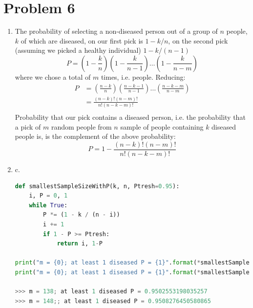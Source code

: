 \documentclass{article}
\newcommand{\1}{\mathbf{1}}
\begin{document}
\section*{Problem 6}
\begin{enumerate}
	\item The probability of selecting a non-diseased person out of a group of $n$ people, $k$ of which are diseased, on our first pick is $1 - k/n$, on the second pick (assuming we picked a healthy individual) $1-k/(n-1)$
	$$P = \left(1 - \frac{k}{n}\right) \left(1 - \frac{k}{n-1}\right) \dots \left(1 - \frac{k}{n-m}\right) $$
	where we chose a total of $m$ times, i.e. people. Reducing:
	\begin{align*}
    P &= \left(\frac{n-k}{n}\right) \left(\frac{n-k-1}{n-1}\right) \dots \left(\frac{n-k-m}{n-m}\right) \\
      &= \frac{(n-k)!(n-m)!}{n!(n-k-m)!} \\
    \end{align*}
    Probability that our pick contains a diseased person, i.e. the probability that a pick of $m$ random people from $n$ sample of people containing $k$ diseased people is, is the complement of the above probability:
    $$P = 1- \frac{(n-k)!(n-m)!}{n!(n-k-m)!}$$
    \item \addtocounter{enumi}{1} c.
        \begin{lstlisting}[language=Python]
def smallestSampleSizeWithP(k, n, Ptresh=0.95):
    i, P = 0, 1
    while True:
        P *= (1 - k / (n - i))
        i += 1
        if 1 - P >= Ptresh:
            return i, 1-P

print("m = {0}; at least 1 diseased P = {1}".format(*smallestSampleSizeWithP(20, 1000)))
print("m = {0}; at least 1 diseased P = {1}".format(*smallestSampleSizeWithP(200, 10000)))

>>> m = 138; at least 1 diseased P = 0.9502553198035257
>>> m = 148;; at least 1 diseased P = 0.9508276450580865
        \end{lstlisting}
    

\end{enumerate}
\end{document}
